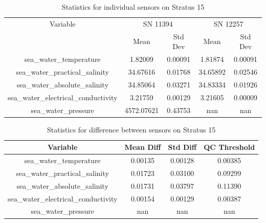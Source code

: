 \begin{table}[h]
\centering
\begin{tabular}{|c|c|c|c|c|}
\hline
Variable & \multicolumn{2}{c|}{SN 11394} & \multicolumn{2}{c|}{SN 12257} \\
& Mean & Std Dev & Mean & Std Dev \\
\hline
sea\_water\_temperature & 1.82009 & 0.00091 & 1.81874 & 0.00091 \\
sea\_water\_practical\_salinity & 34.67616 & 0.01768 & 34.65892 & 0.02546 \\
sea\_water\_absolute\_salinity & 34.85064 & 0.03271 & 34.83334 & 0.01926 \\
sea\_water\_electrical\_conductivity & 3.21759 & 0.00129 & 3.21605 & 0.00009 \\
sea\_water\_pressure & 4572.07621 & 0.43753 & nan & nan \\
\hline
\end{tabular}
\caption{Statistics for individual sensors on Stratus 15}
\end{table}

\begin{table}[h]
\centering
\begin{tabular}{|c|c|c|c|}
\hline
Variable & Mean Diff & Std Diff & QC Threshold \\
\hline
sea\_water\_temperature & 0.00135 & 0.00128 & 0.00385 \\
sea\_water\_practical\_salinity & 0.01723 & 0.03100 & 0.09299 \\
sea\_water\_absolute\_salinity & 0.01731 & 0.03797 & 0.11390 \\
sea\_water\_electrical\_conductivity & 0.00154 & 0.00129 & 0.00387 \\
sea\_water\_pressure & nan & nan & nan \\
\hline
\end{tabular}
\caption{Statistics for difference between sensors on Stratus 15}
\end{table}
